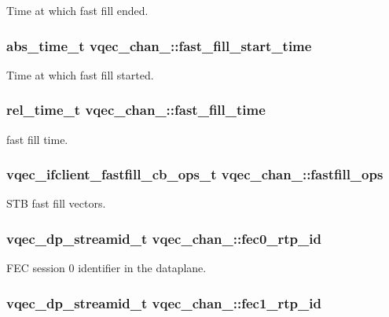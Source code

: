 Time at which fast fill ended. 
\subsubsection{\setlength{\rightskip}{0pt plus 5cm}abs\_\-time\_\-t \bf{vqec\_\-chan\_\-::fast\_\-fill\_\-start\_\-time}}\label{structvqec__chan___226066032ad8ec0aac8cb97484884140}


Time at which fast fill started. 
\subsubsection{\setlength{\rightskip}{0pt plus 5cm}rel\_\-time\_\-t \bf{vqec\_\-chan\_\-::fast\_\-fill\_\-time}}\label{structvqec__chan___cad4f5d039510b481629067124dd7e68}


fast fill time. 
\subsubsection{\setlength{\rightskip}{0pt plus 5cm}\bf{vqec\_\-ifclient\_\-fastfill\_\-cb\_\-ops\_\-t} \bf{vqec\_\-chan\_\-::fastfill\_\-ops}}\label{structvqec__chan___6802bd29d9230bef52700cc84e30d681}


STB fast fill vectors. 
\subsubsection{\setlength{\rightskip}{0pt plus 5cm}vqec\_\-dp\_\-streamid\_\-t \bf{vqec\_\-chan\_\-::fec0\_\-rtp\_\-id}}\label{structvqec__chan___6f8d4b5d02f57993796f2b3db73ba4c1}


FEC session 0 identifier in the dataplane. 
\subsubsection{\setlength{\rightskip}{0pt plus 5cm}vqec\_\-dp\_\-streamid\_\-t \bf{vqec\_\-chan\_\-::fec1\_\-rtp\_\-id}}\label{structvqec__chan___5a56bdaaa37b5bd6ac6a6c86a055663e}


